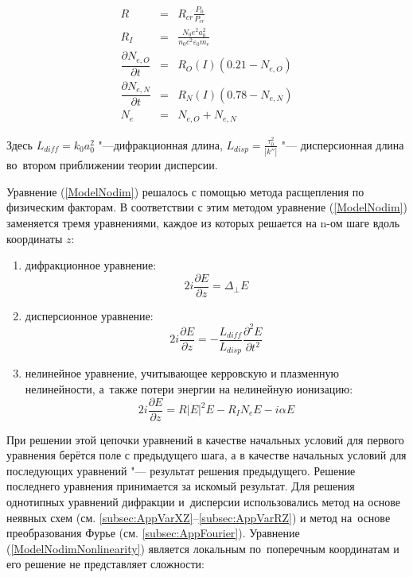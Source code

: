 \begin{equation*}
\begin{array}{rcl}
R & = & R_{cr} \frac{P_0}{P_{cr}} \\[1.0ex]
R_{I} & = & \frac{N_0 e^2 a_0^2}{n_0 c^2 \varepsilon_0 m_e} \\[1.0ex]
\dfrac{\partial N_{e,O}}{\partial t} & = & R_{O}(I)(0.21 - N_{e,O}) \\[1.0ex]
\dfrac{\partial N_{e,N}}{\partial t} & = & R_{N}(I)(0.78 - N_{e,N}) \\[1.0ex]
N_{e} & = & N_{e,O} + N_{e,N}
\end{array}
\end{equation*}

Здесь $L_{diff} = k_0 a_0^2$ "---дифракционная длина, $L_{disp} = \frac{\tau_0^2}{|k''|}$ "--- дисперсионная длина во~втором приближении теории дисперсии.


Уравнение (\ref{ModelNodim}) решалось  с помощью метода расщепления по физическим факторам.
В соответствии с этим методом уравнение (\ref{ModelNodim}) заменяется тремя уравнениями,
каждое из которых решается на n-ом шаге вдоль координаты $z$:

\begin{enumerate}
    \item дифракционное уравнение: \\
    \begin{equation}\label{ModelNodimDiffraction}
    2 i \dfrac{\partial E}{\partial z} = \Delta_{\perp}E
    \end{equation}

    \item дисперсионное  уравнение: \\
    \begin{equation}\label{ModelNodimDispersion}
    2 i \dfrac{\partial E}{\partial z} = - \dfrac{L_{diff}}{L_{disp}} \dfrac{\partial^2 E}{\partial t^2}
    \end{equation}

    \item нелинейное уравнение, учитывающее керровскую и плазменную нелинейности, а~также потери энергии на нелинейную ионизацию: \\
    \begin{equation}\label{ModelNodimNonlinearity}
    2 i \dfrac{\partial E}{\partial z} = R |E|^2 E - R_{I} N_{e} E - i \alpha E
    \end{equation}
\end{enumerate}

При решении этой цепочки уравнений в качестве начальных условий для первого уравнения берётся поле с предыдущего шага,
а в качестве начальных условий для последующих уравнений "--- результат решения предыдущего.
Решение последнего уравнения принимается за искомый результат. Для решения однотипных уравнений дифракции и~дисперсии
использовались метод на основе неявных схем (см. \ref{subsec:AppVarXZ}--\ref{subsec:AppVarRZ}) и метод на~основе преобразования Фурье (см. \ref{subsec:AppFourier}).
Уравнение (\ref{ModelNodimNonlinearity}) является локальным по~поперечным координатам и его решение не представляет сложности:

